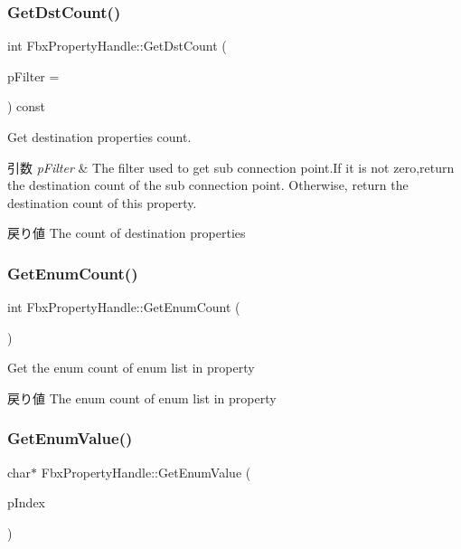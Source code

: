 \subsubsection{\texorpdfstring{Get\+Dst\+Count()}{GetDstCount()}}
{\footnotesize\ttfamily int Fbx\+Property\+Handle\+::\+Get\+Dst\+Count (\begin{DoxyParamCaption}\item[{\hyperlink{class_fbx_connection_point_filter}{Fbx\+Connection\+Point\+Filter} $\ast$}]{p\+Filter = {} }\end{DoxyParamCaption}) const}

Get destination properties\textquotesingle{} count. 
\begin{DoxyParams}{引数}
{\em p\+Filter} & The filter used to get sub connection point.\+If it is not zero,return the destination count of the sub connection point. Otherwise, return the destination count of this property. \\
\hline
\end{DoxyParams}
\begin{DoxyReturn}{戻り値}
The count of destination properties 
\end{DoxyReturn}
\mbox{\label{class_fbx_property_handle_a2402b4e7a56046ebb4f1b941a447b197}} 
\subsubsection{\texorpdfstring{Get\+Enum\+Count()}{GetEnumCount()}}
{\footnotesize\ttfamily int Fbx\+Property\+Handle\+::\+Get\+Enum\+Count (\begin{DoxyParamCaption}{ }\end{DoxyParamCaption})}

Get the enum count of enum list in property \begin{DoxyReturn}{戻り値}
The enum count of enum list in property 
\end{DoxyReturn}
\mbox{\label{class_fbx_property_handle_a0c80a68745b75cb46ca742603506f75b}} 
\subsubsection{\texorpdfstring{Get\+Enum\+Value()}{GetEnumValue()}}
{\footnotesize\ttfamily char$\ast$ Fbx\+Property\+Handle\+::\+Get\+Enum\+Value (\begin{DoxyParamCaption}\item[{int}]{p\+Index }\end{DoxyParamCaption})}

